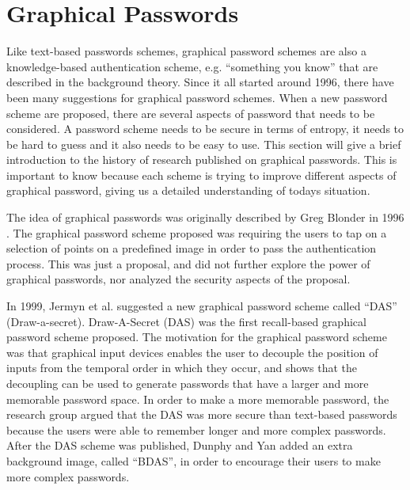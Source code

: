 \section{Graphical Passwords}


  Like text-based passwords schemes, graphical password schemes are also a knowledge-based authentication scheme, e.g. ``something you know'' that are described in the background theory. Since it all started around 1996, there have been many suggestions for graphical password schemes. When a new password scheme are proposed, there are several aspects of password that needs to be considered. A password scheme needs to be secure in terms of entropy, it needs to be hard to guess and it also needs to be easy to use. This section will give a brief introduction to the history of research published on graphical passwords. This is important to know because each scheme is trying to improve different aspects of graphical password, giving us a detailed understanding of todays situation. 

  The idea of graphical passwords was originally described by Greg Blonder in 1996 \cite{Blonder}. The graphical password scheme proposed was requiring the users to tap on a selection of points on a predefined image in order to pass the authentication process. This was just a proposal, and did not further explore the power of graphical passwords, nor analyzed the security aspects of the proposal. 

  In 1999, Jermyn et al. \cite{Jermyn} suggested a new graphical password scheme called ``DAS'' (Draw-a-secret). Draw-A-Secret (DAS) was the first recall-based graphical password scheme proposed. The motivation for the graphical password scheme was that graphical input devices enables the user to decouple the position of inputs from the temporal order in which they occur, and shows that the decoupling can be used to generate passwords that have a larger and more memorable password space. In order to make a more memorable password, the research group argued that the DAS was more secure than text-based passwords because the users were able to remember longer and more complex passwords. After the DAS scheme was published, Dunphy and Yan \cite{BDAS} added an extra background image, called ``BDAS'', in order to encourage their users to make more complex passwords.

